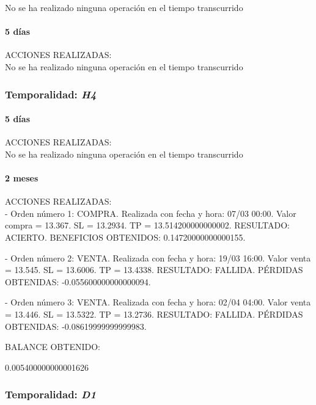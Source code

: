 No se ha realizado ninguna operación en el tiempo transcurrido

\paragraph{5 días}

ACCIONES REALIZADAS:\\

No se ha realizado ninguna operación en el tiempo transcurrido

\subsubsection{Temporalidad: \textit{H4}}

\paragraph{5 días}

ACCIONES REALIZADAS:\\

No se ha realizado ninguna operación en el tiempo transcurrido

\paragraph{2 meses}

ACCIONES REALIZADAS:\\

- Orden número 1: COMPRA. Realizada con fecha y hora: 07/03 00:00. Valor compra = 13.367. SL = 13.2934. TP = 13.514200000000002. RESULTADO: ACIERTO. BENEFICIOS OBTENIDOS: 0.14720000000000155.\newline

- Orden número 2: VENTA. Realizada con fecha y hora: 19/03 16:00. Valor venta = 13.545. SL = 13.6006. TP = 13.4338. RESULTADO: FALLIDA. PÉRDIDAS OBTENIDAS: -0.055600000000000094.\newline

- Orden número 3: VENTA. Realizada con fecha y hora: 02/04 04:00. Valor venta = 13.446. SL = 13.5322. TP = 13.2736. RESULTADO: FALLIDA. PÉRDIDAS OBTENIDAS: -0.08619999999999983.\newline

\color{blue}
BALANCE OBTENIDO:\newline

0.005400000000001626\newline
\color{black}

\subsubsection{Temporalidad: \textit{D1}}


